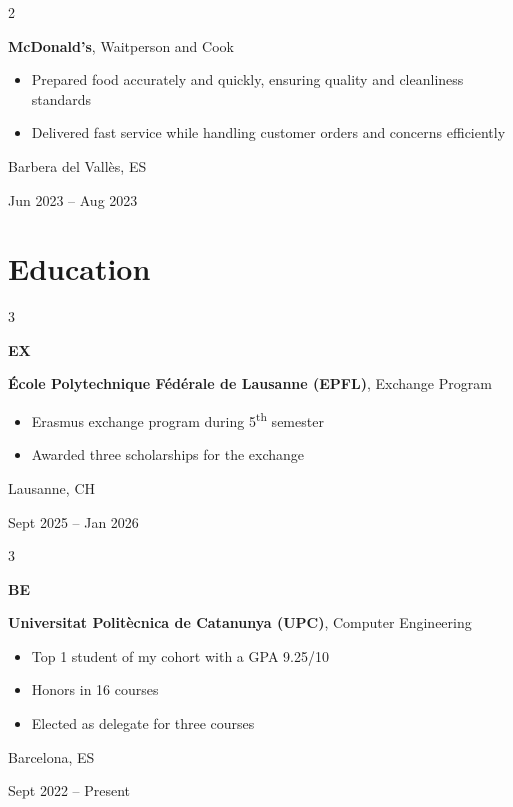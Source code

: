 \documentclass[10pt, letterpaper]{article}
\newenvironment{highlights}{
    \begin{itemize}[
        topsep=0.10 cm,
        parsep=0.10 cm,
        partopsep=0pt,
        itemsep=0pt,
        leftmargin=0.4 cm + 10pt
    ]
}{
    \end{itemize}
} %
\newenvironment{twocolentry}[2][]{
    \onecolentry
    \def\secondColumn{#2}
    \setcolumnwidth{\fill, 4.5 cm}
    \begin{paracol}{2}
}{
    \switchcolumn \raggedleft \secondColumn
    \end{paracol}
    \endonecolentry
} %
\newenvironment{threecolentry}[3][]{
    \onecolentry
    \def\thirdColumn{#3}
    \setcolumnwidth{1 cm, \fill, 4.5 cm}
    \begin{paracol}{3}
    {\raggedright #2} \switchcolumn
}{
    \switchcolumn \raggedleft \thirdColumn
    \end{paracol}
    \endonecolentry
} %
\begin{document}
        \vspace{0.2 cm}

        \begin{twocolentry}{
            Barbera del Vallès, ES
            
            Jun 2023 – Aug 2023
        }
            \textbf{McDonald's}, Waitperson and Cook
            \begin{highlights}
                \item Prepared food accurately and quickly, ensuring quality and cleanliness standards
                \item Delivered fast service while handling customer orders and concerns efficiently
            \end{highlights}
        \end{twocolentry}


    \section{Education}
        \begin{threecolentry}{\textbf{EX}}{
            Lausanne, CH
            
            Sept 2025 – Jan 2026
        }
            \textbf{École Polytechnique Fédérale de Lausanne (EPFL)}, Exchange Program
            \begin{highlights}
                \item Erasmus exchange program during 5\textsuperscript{th} semester
                \item Awarded three scholarships for the exchange
            \end{highlights}
        \end{threecolentry}
    
        \begin{threecolentry}{\textbf{BE}}{
            Barcelona, ES
            
            Sept 2022 – Present
        }
            \textbf{Universitat Politècnica de Catanunya (UPC)}, Computer Engineering
            \begin{highlights}
                \item Top 1 student of my cohort with a GPA 9.25/10
                \item Honors in 16 courses
                \item Elected as delegate for three courses
            \end{highlights}
        \end{threecolentry}
\end{document}
